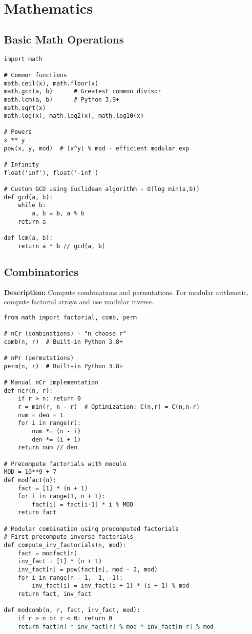 \section{Mathematics}

\subsection{Basic Math Operations}
\begin{lstlisting}
import math

# Common functions
math.ceil(x), math.floor(x)
math.gcd(a, b)      # Greatest common divisor
math.lcm(a, b)      # Python 3.9+
math.sqrt(x)
math.log(x), math.log2(x), math.log10(x)

# Powers
x ** y
pow(x, y, mod)  # (x^y) % mod - efficient modular exp

# Infinity
float('inf'), float('-inf')

# Custom GCD using Euclidean algorithm - O(log min(a,b))
def gcd(a, b):
    while b:
        a, b = b, a % b
    return a

def lcm(a, b):
    return a * b // gcd(a, b)
\end{lstlisting}

\subsection{Combinatorics}
\textbf{Description:} Compute combinations and permutations. For modular arithmetic, compute factorial arrays and use modular inverse.

\begin{lstlisting}
from math import factorial, comb, perm

# nCr (combinations) - "n choose r"
comb(n, r)  # Built-in Python 3.8+

# nPr (permutations)
perm(n, r)  # Built-in Python 3.8+

# Manual nCr implementation
def ncr(n, r):
    if r > n: return 0
    r = min(r, n - r)  # Optimization: C(n,r) = C(n,n-r)
    num = den = 1
    for i in range(r):
        num *= (n - i)
        den *= (i + 1)
    return num // den

# Precompute factorials with modulo
MOD = 10**9 + 7
def modfact(n):
    fact = [1] * (n + 1)
    for i in range(1, n + 1):
        fact[i] = fact[i-1] * i % MOD
    return fact

# Modular combination using precomputed factorials
# First precompute inverse factorials
def compute_inv_factorials(n, mod):
    fact = modfact(n)
    inv_fact = [1] * (n + 1)
    inv_fact[n] = pow(fact[n], mod - 2, mod)
    for i in range(n - 1, -1, -1):
        inv_fact[i] = inv_fact[i + 1] * (i + 1) % mod
    return fact, inv_fact

def modcomb(n, r, fact, inv_fact, mod):
    if r > n or r < 0: return 0
    return fact[n] * inv_fact[r] % mod * inv_fact[n-r] % mod
\end{lstlisting}

